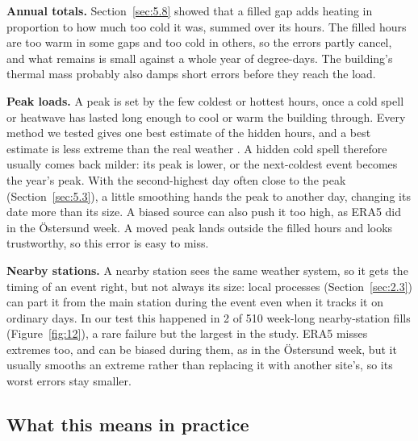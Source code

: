 \textbf{Annual totals.} Section~\ref{sec:5.8} showed that a filled gap adds heating in proportion to how much too cold it was, summed over its hours. The filled hours are too warm in some gaps and too cold in others, so the errors partly cancel, and what remains is small against a whole year of degree-days. The building's thermal mass probably also damps short errors before they reach the load.

\textbf{Peak loads.} A peak is set by the few coldest or hottest hours, once a cold spell or heatwave has lasted long enough to cool or warm the building through. Every method we tested gives one best estimate of the hidden hours, and a best estimate is less extreme than the real weather \citep{little2019,begueria2019}. A hidden cold spell therefore usually comes back milder: its peak is lower, or the next-coldest event becomes the year's peak. With the second-highest day often close to the peak (Section~\ref{sec:5.3}), a little smoothing hands the peak to another day, changing its date more than its size. A biased source can also push it too high, as ERA5 did in the Östersund week. A moved peak lands outside the filled hours and looks trustworthy, so this error is easy to miss.

\textbf{Nearby stations.} A nearby station sees the same weather system, so it gets the timing of an event right, but not always its size: local processes (Section~\ref{sec:2.3}) can part it from the main station during the event even when it tracks it on ordinary days. In our test this happened in 2 of 510 week-long nearby-station fills (Figure~\ref{fig:12}), a rare failure but the largest in the study. ERA5 misses extremes too, and can be biased during them, as in the Östersund week, but it usually smooths an extreme rather than replacing it with another site's, so its worst errors stay smaller.

\subsection{What this means in practice}\label{sec:6.3}

